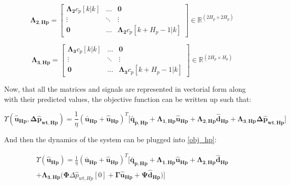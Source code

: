 \begin{equation}
\bm{\Lambda_{2,Hp}} =
 \begin{bmatrix}
 \bm{\Lambda_2} c_p[k|k] & \hdots & \bm{0} \\
 \vdots & \ddots & \vdots\\
 \bm{0} & \hdots & \bm{\Lambda_2} c_p[k+H_p-1|k] 
 \end{bmatrix}
 \in \pmb{\mathbb{R}}^{(2 H_p \times 2 H_p)}
\end{equation} 

\begin{equation}
\bm{\Lambda_{3,Hp}} =
 \begin{bmatrix}
 \bm{\Lambda_3} c_p[k|k] & \hdots & \bm{0} \\
 \vdots & \ddots & \vdots\\
 \bm{0} & \hdots & \bm{\Lambda_3} c_p[k+H_p-1|k] 
 \end{bmatrix}
 \in \pmb{\mathbb{R}}^{(2 H_p \times H_p)}
\end{equation} 

Now, that all the matrices and signals are represented in vectorial form along with their predicted values, the objective function can be written up such that:

\begin{equation}
  \Upsilon({\bm{\hat{u}}}_{\bm{{Hp}}},\bm{\Delta \hat{p}_{wt,Hp}}) = \frac{1}{\eta} ({\bm{\bar{u}}}_{\bm{{Hp}}} + {\bm{\hat{u}}}_{\bm{{Hp}}})^{T} \bigg[ {\bm{\bar{q}}}_{\bm{p,Hp}} + {\bm{\Lambda}}_{\bm{1,Hp}} {\bm{\hat{u}}}_{\bm{Hp}} + {\bm{\Lambda}}_{\bm{2,Hp}} {\bm{\hat{d}}}_{\bm{Hp}} 
  + {\bm{\Lambda}}_{\bm{3,Hp}} \bm{\Delta \hat{p}_{wt,Hp}} \bigg]
 \label{obj_hp}
\end{equation}

And then the dynamics of the system can be plugged into \eqref{obj_hp}:

\begin{equation}
\begin{aligned}
 \Upsilon({\bm{\hat{u}}}_{\bm{{Hp}}}) = \frac{1}{\eta} ({\bm{\bar{u}}}_{\bm{{Hp}}} + {\bm{\hat{u}}}_{\bm{{Hp}}})^{T}  \bigg[ {\bm{\bar{q}}}_{\bm{p,Hp}} + {\bm{\Lambda}}_{\bm{1,Hp}} {\bm{\hat{u}}}_{\bm{Hp}} + {\bm{\Lambda}}_{\bm{2,Hp}} {\bm{\hat{d}}}_{\bm{Hp}} 
   \\ + {\bm{\Lambda}}_{\bm{3,Hp}} \bigg( \bm{\Phi} \Delta \hat{p}_{wt,Hp}[0] + \bm{\Gamma} \bm{\hat{u}}_{\bm{Hp}} + \bm{\Psi}\bm{\hat{d}}_{\bm{Hp}} \bigg) \bigg]
\end{aligned}
\label{obj_hp_dyn}
\end{equation}

